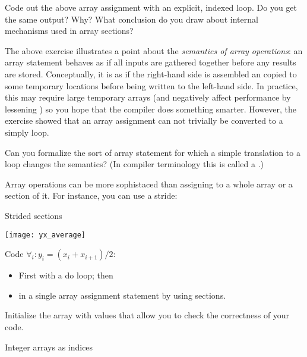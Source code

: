 \begin{exercise}
  \label{ex:sect-vs-loop}
  Code out the above array assignment with an explicit,
  indexed loop. Do you get the same output? Why? What conclusion do
  you draw about internal mechanisms used in array sections?
\end{exercise}

The above exercise illustrates a point about the
\emph{semantics of array operations}:
an array statement behaves as if all inputs are gathered together
before any results are stored.
Conceptually, it is as if the right-hand side is assembled an copied
to some temporary locations before being written to the left-hand side.
In practice, this may require large temporary arrays
(and negatively affect performance by lessening )
so you hope that the compiler does something smarter.
However, the exercise showed that an array assignment can not trivially
be converted to a simply loop.

\begin{exercise}
  Can you formalize the sort of array statement for which a simple
  translation to a loop changes the semantics? (In compiler
  terminology this is called a .)
\end{exercise}

Array operations can be more sophistaced than assigning to a whole
array or a section of it.
For instance, you can use a stride:

\begin{block}{Strided sections}
  \label{sl:farray-strideassign}
\end{block}

\begin{exercise}
  \label{ex:farray-shift}

  \texttt{[image: yx\_average]}

  Code $\forall_i\colon y_i=(x_i+x_{i+1})/2$:
  \begin{itemize}
  \item First with a do loop; then
  \item in a single array assignment statement by using sections.
  \end{itemize}
  Initialize the array  with values that allow you to check the
  correctness of your code.
\end{exercise}

 {Integer arrays as indices}

